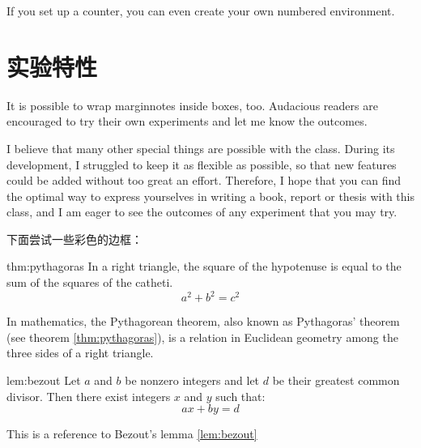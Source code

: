 \begin{kaobox}[frametitle=Title of the box]
	\blindtext
\end{kaobox}

If you set up a counter, you can even create your own numbered
environment.

\begin{kaocounter}
	\blindtext
\end{kaocounter}

\section{实验特性}

It is possible to wrap marginnotes inside boxes, too. Audacious readers
are encouraged to try their own experiments and let me know the
outcomes.


I believe that many other special things are possible with the
 class. During its development, I struggled to keep it as
flexible as possible, so that new features could be added without too
great an effort. Therefore, I hope that you can find the optimal way to
express yourselves in writing a book, report or thesis with this class,
and I am eager to see the outcomes of any experiment that you may try.

下面尝试一些彩色的边框：

\begin{theo}{thm:pythagoras}
	In a right triangle, the square of the hypotenuse is equal to the sum of the squares of the catheti.
	\[a^2+b^2=c^2\]
\end{theo}
In mathematics, the Pythagorean theorem, also known as Pythagoras' theorem (see theorem \ref{thm:pythagoras}), is a relation in Euclidean geometry among the three sides of a right triangle.

\begin{lem}{lem:bezout}
	Let $a$ and $b$ be nonzero integers and let $d$ be their greatest common divisor. Then there exist integers $x$ and $y$ such that:
	\[ax+by=d\]
\end{lem}
This is a reference to Bezout's lemma \ref{lem:bezout}

